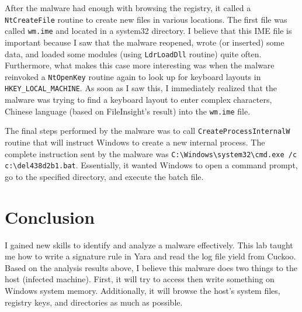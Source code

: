 \documentclass[letterpaper,10pt,titlepage,draftclsnofoot,onecolumn]{IEEEtran}
\begin{document}
After the malware had enough with browsing the registry, it called a \verb|NtCreateFile| routine to create new files in various locations. 
The first file was called \verb|wm.ime| and located in a system32 directory.
I believe that this IME file is important because I saw that the malware reopened, wrote (or inserted) some data, and loaded some modules (using \verb|LdrLoadDll| routine) quite often.
Furthermore, what makes this case more interesting was when the malware reinvoked a \verb|NtOpenKey| routine again to look up for keyboard layouts in \verb|HKEY_LOCAL_MACHINE|.
As soon as I saw this, I immediately realized that the malware was trying to find a keyboard layout to enter complex characters, Chinese language (based on FileInsight's result) into the \verb|wm.ime| file.

The final steps performed by the malware was to call \verb|CreateProcessInternalW| routine that will instruct Windows to create a new internal process.
The complete instruction sent by the malware was \verb|C:\Windows\system32\cmd.exe /c c:\del438d2b1.bat|.
Essentially, it wanted Windows to open a command prompt, go to the specified directory, and execute the batch file.

\section{Conclusion}
I gained new skills to identify and analyze a malware effectively. 
This lab taught me how to write a signature rule in Yara and read the log file yield from Cuckoo. 
Based on the analysis results above, I believe this malware does two things to the host (infected machine). 
First, it will try to access then write something on Windows system memory. 
Additionally, it will browse the host's system files, registry keys, and directories as much as possible.
\end{document}
